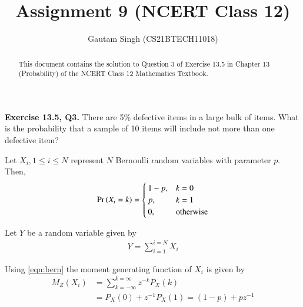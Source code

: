 \documentclass[journal,12pt,twocolumn]{IEEEtran}
\begin{document}
\makeatletter
{}
\makeatother
\let\StandardTheFigure\thefigure
\let\vec\mathbf
\renewcommand{\thefigure}{\arabic{figure}}
\def\putbox#1#2#3{\makebox[0in][l]{\makebox[#1][l]{}\raisebox{\baselineskip}[0in][0in]{\raisebox{#2}[0in][0in]{#3}}}}
     \def\rightbox#1{\makebox[0in][r]{#1}}
     \def\centbox#1{\makebox[0in]{#1}}
     \def\topbox#1{\raisebox{-\baselineskip}[0in][0in]{#1}}
     \def\midbox#1{\raisebox{-0.5\baselineskip}[0in][0in]{#1}}
\vspace{3cm}
\title{Assignment 9 (NCERT Class 12)}
\author{Gautam Singh (CS21BTECH11018)}	
\maketitle

\begin{abstract}
This document contains the solution to Question 3 of Exercise 13.5 in Chapter 13 (Probability) of the NCERT Class 12 Mathematics Textbook.
\end{abstract}

\noindent \textbf{Exercise 13.5, Q3.} There are 5\% defective items in a large bulk of items. What is the probability that a sample of 10 items will include not more than one defective item?

\solution Let $X_{i}, 1 \leq i \leq N$ represent $N$ Bernoulli random variables with parameter $p$. Then,
\begin{align}
\Pr\left(X_i = k\right) = 
\begin{cases}
1 - p, & k = 0 \\
p, & k = 1 \\
0, & \textrm{otherwise}
\end{cases}
\label{eqn:bern}
\end{align}

\noindent Let $Y$ be a random variable given by 
\begin{align}
Y = \sum_{i = 1}^{i = N}X_i
\label{eqn:Y}
\end{align}

\noindent Using \autoref{eqn:bern} the moment generating function of $X_i$ is given by
\begin{align}
M_Z(X_i) &= \sum_{k = -\infty}^{k = \infty}z^{-k}P_X(k) \\
&= P_X(0) + z^{-1}P_X(1) = (1 - p) + pz^{-1}
\label{eqn:mgf-X}
\end{align}
\end{document}
